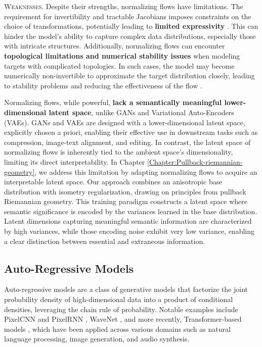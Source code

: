 \textsc{Weaknesses.} Despite their strengths, normalizing flows have limitations. The requirement for invertibility and tractable Jacobians imposes constraints on the choice of transformations, potentially leading to \textbf{limited expressivity} \cite{papamakarios2019normalizing}. This can hinder the model's ability to capture complex data distributions, especially those with intricate structures. Additionally, normalizing flows can encounter \textbf{topological limitations and numerical stability issues} when modeling targets with complicated topologies. In such cases, the model may become numerically non-invertible to approximate the target distribution closely, leading to stability problems and reducing the effectiveness of the flow \cite{behrmann2021understanding, cornish2020relaxing}. 

Normalizing flows, while powerful, \textbf{lack a semantically meaningful lower-dimensional latent space}, unlike GANs and Variational Auto-Encoders (VAEs). GANs and VAEs are designed with a lower-dimensional latent space, explicitly chosen a priori, enabling their effective use in downstream tasks such as compression, image-text alignment, and editing. In contrast, the latent space of normalizing flows is inherently tied to the ambient space's dimensionality, limiting its direct interpretability. In Chapter \ref{Chapter:Pullback-riemannian-geometry}, we address this limitation by adapting normalizing flows to acquire an interpretable latent space. Our approach combines an anisotropic base distribution with isometry regularization, drawing on principles from pullback Riemannian geometry. This training paradigm constructs a latent space where semantic significance is encoded by the variances learned in the base distribution. Latent dimensions capturing meaningful semantic information are characterized by high variances, while those encoding noise exhibit very low variance, enabling a clear distinction between essential and extraneous information.

\subsection{Auto-Regressive Models}\label{sec:auto_regressive_models}

Auto-regressive models are a class of generative models that factorize the joint probability density of high-dimensional data into a product of conditional densities, leveraging the chain rule of probability. Notable examples include PixelCNN and PixelRNN \cite{oord2016pixel}, WaveNet \cite{vanwavenet2016}, and more recently, Transformer-based models \cite{vaswani2017attention}, which have been applied across various domains such as natural language processing, image generation, and audio synthesis.

